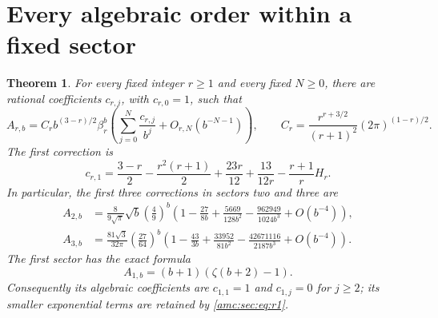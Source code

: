 \documentclass[11pt,letterpaper]{article}
\newtheorem{theorem}{Theorem}[section]
\theoremstyle{remark}\newtheorem{remark}[theorem]{Remark}
\begin{document}
\section{Every algebraic order within a fixed sector}
\begin{theorem}\label{amc:sec:thm:algebraic}
For every fixed integer $r\ge1$ and every fixed $N\ge0$, there are rational coefficients $c_{r,j}$, with $c_{r,0}=1$, such that
\begin{equation}\label{amc:sec:eq:allorders}
 A_{r,b}=C_r b^{(3-r)/2}\beta_r^b
 \left(\sum_{j=0}^N\frac{c_{r,j}}{b^j}+O_{r,N}(b^{-N-1})\right),
 \qquad C_r=\frac{r^{r+3/2}}{(r+1)^2}(2\pi)^{(1-r)/2}.
\end{equation}
The first correction is
\begin{equation}\label{amc:sec:eq:first-coefficient}
 c_{r,1}=\frac{3-r}{2}-\frac{r^2(r+1)}2
          +\frac{23r}{12}+\frac{13}{12r}-\frac{r+1}{r}H_r.
\end{equation}
In particular, the first three corrections in sectors two and three are
\begin{align}
 A_{2,b}&=\frac8{9\sqrt\pi}\sqrt b\left(\frac49\right)^b
 \left(1-\frac{27}{8b}+\frac{5669}{128b^2}
             -\frac{962949}{1024b^3}+O(b^{-4})\right),\label{amc:sec:eq:r2}\\
 A_{3,b}&=\frac{81\sqrt3}{32\pi}\left(\frac{27}{64}\right)^b
 \left(1-\frac{43}{3b}+\frac{33952}{81b^2}
             -\frac{42671116}{2187b^3}+O(b^{-4})\right).\label{amc:sec:eq:r3}
\end{align}
The first sector has the exact formula
\begin{equation}\label{amc:sec:eq:r1}
 A_{1,b}=(b+1)(\zeta(b+2)-1).
\end{equation}
Consequently its algebraic coefficients are $c_{1,1}=1$ and $c_{1,j}=0$ for $j\ge2$; its smaller exponential terms are retained by \eqref{amc:sec:eq:r1}.
\end{theorem}
\end{document}
